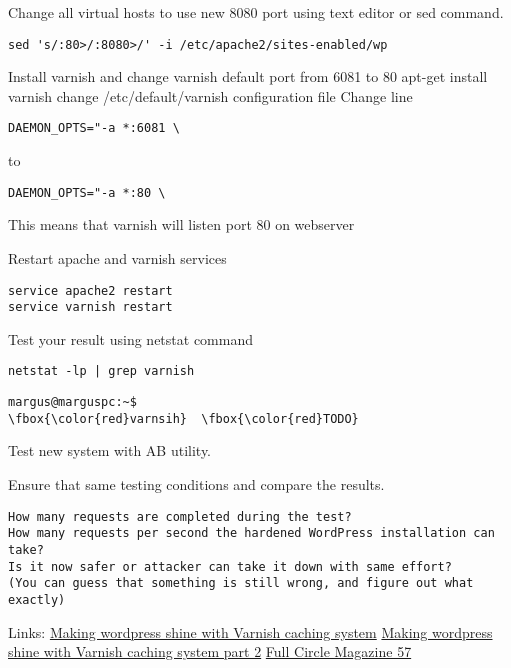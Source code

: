 Change all virtual hosts to use new 8080 port using text editor or sed command.

\begin{verbatim}
sed 's/:80>/:8080>/' -i /etc/apache2/sites-enabled/wp
\end{verbatim}


Install varnish and change varnish default port from 6081 to 80
apt-get install varnish
change /etc/default/varnish configuration file
Change line
\begin{verbatim}
DAEMON_OPTS="-a *:6081 \ 
\end{verbatim}
to
\begin{verbatim}
DAEMON_OPTS="-a *:80 \
\end{verbatim}

This means that varnish will listen port 80 on webserver

Restart apache and varnish services
\begin{verbatim}
service apache2 restart
service varnish restart
\end{verbatim}
Test your result using netstat command

\begin{verbatim}
netstat -lp | grep varnish
\end{verbatim}


\begin{Verbatim}[frame=single,
label=Command output,framesep=2mm,rulecolor=\color{red},commandchars=\\\{\}]
margus@marguspc:~$ 
\fbox{\color{red}varnsih}  \fbox{\color{red}TODO}
\end{Verbatim}


Test new system with AB utility.

Ensure that same testing conditions and compare the results.
\begin{Verbatim}[samepage=true,frame=single,
label=Discussion,framesep=2mm,rulecolor=\color{blue},commandchars=\\\{\}]
How many requests are completed during the test?
How many requests per second the hardened WordPress installation can take?
Is it now safer or attacker can take it down with same effort? 
(You can guess that something is still wrong, and figure out what exactly)
\end{Verbatim}

Links:
\href{http://kaanon.com/blog/work/making-wordpress-shine-varnish-caching-system-part-1}{Making wordpress shine with Varnish caching system}
\href{http://kaanon.com/blog/varnish/making-wordpress-shine-varnish-caching-system-part-2}{Making wordpress shine with Varnish caching system part 2}
\href{http://www.google.com/producer/editions/CAowvZtX/full_circle_magazine_57_lite}
{Full Circle Magazine 57}

